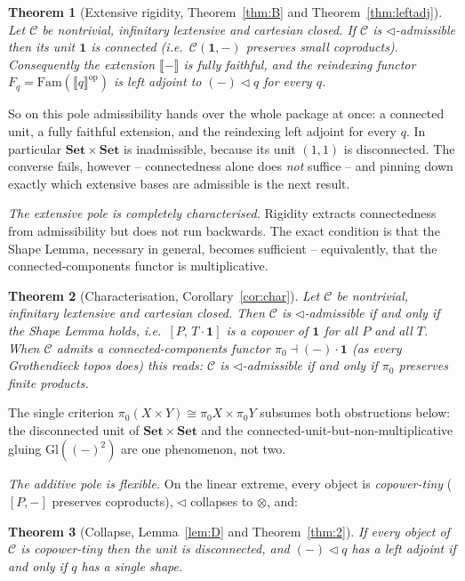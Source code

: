 \documentclass[11pt]{amsart}
\theoremstyle{plain}
\newtheorem{theorem}{Theorem}[section]
\theoremstyle{definition}
\newcommand{\C}{\mathcal{C}}
\newcommand{\Fam}{\mathrm{Fam}}
\newcommand{\ext}[1]{\llbracket #1 \rrbracket}
\newcommand{\Setb}{\mathbf{Set}}
\newcommand{\Gl}{\mathrm{Gl}}
\newcommand{\op}{\mathrm{op}}
\newcommand{\comp}{\mathbin{\triangleleft}}
\newcommand{\one}{\mathbf{1}}
\newcommand{\pizero}{\pi_0}
\begin{document}
\begin{theorem}[Extensive rigidity, Theorem~\ref{thm:B} and Theorem~\ref{thm:leftadj}]
\label{intro:B}
Let $\C$ be nontrivial, infinitary lextensive and cartesian closed. If $\C$ is $\comp$-admissible
then its unit $\one$ is \emph{connected} (i.e.\ $\C(\one,-)$ preserves small coproducts).
Consequently the extension $\ext{-}$ is fully faithful, and the reindexing functor
$F_q=\Fam(\ext q^{\op})$ is left adjoint to $({-})\comp q$ for \emph{every} $q$.
\end{theorem}

So on this pole admissibility hands over the whole package at once: a connected unit, a fully faithful
extension, and the reindexing left adjoint for every $q$. In particular $\Setb\times\Setb$ is
inadmissible, because its unit $(1,1)$ is disconnected. The converse fails, however -- connectedness
alone does \emph{not} suffice -- and pinning down exactly which extensive bases are admissible is the
next result.

\emph{The extensive pole is completely characterised.} Rigidity extracts connectedness from
admissibility but does not run backwards. The exact condition is that the Shape Lemma, necessary in
general, becomes sufficient -- equivalently, that the connected-components functor is multiplicative.

\begin{theorem}[Characterisation, Corollary~\ref{cor:char}]\label{intro:char}
Let $\C$ be nontrivial, infinitary lextensive and cartesian closed. Then $\C$ is $\comp$-admissible if
and only if the Shape Lemma holds, i.e.\ $[P,\,T\cdot\one]$ is a copower of $\one$ for all $P$ and all
$T$. When $\C$ admits a connected-components functor $\pizero\dashv(-)\cdot\one$ (as every Grothendieck
topos does) this reads: $\C$ is $\comp$-admissible if and only if $\pizero$ preserves finite products.
\end{theorem}

The single criterion $\pizero(X\times Y)\cong\pizero X\times\pizero Y$ subsumes both obstructions
below: the disconnected unit of $\Setb\times\Setb$ and the connected-unit-but-non-multiplicative
gluing $\Gl((-)^2)$ are one phenomenon, not two.

\emph{The additive pole is flexible.} On the linear extreme, every object is
\emph{copower-tiny} ($[P,-]$ preserves coproducts), $\comp$ collapses to $\otimes$, and:

\begin{theorem}[Collapse, Lemma~\ref{lem:D} and Theorem~\ref{thm:2}]\label{intro:D}
If every object of $\C$ is copower-tiny then the unit is disconnected, and $({-})\comp q$ has a left
adjoint if and only if $q$ has a single shape.
\end{theorem}
\end{document}
